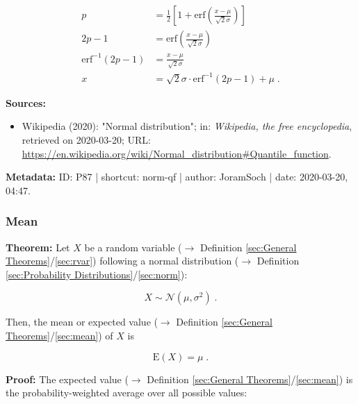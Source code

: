\documentclass[a4paper,12pt,twoside]{book}
\begin{document}
\begin{equation} \label{eq:norm-qf-norm-qf-s2}
\begin{split}
p &= \frac{1}{2} \left[ 1 + \mathrm{erf}\left( \frac{x-\mu}{\sqrt{2} \sigma} \right) \right] \\
2 p - 1 &= \mathrm{erf}\left( \frac{x-\mu}{\sqrt{2} \sigma} \right) \\
\mathrm{erf}^{-1}(2p-1) &= \frac{x-\mu}{\sqrt{2} \sigma} \\
x &= \sqrt{2}\sigma \cdot \mathrm{erf}^{-1}(2p-1) + \mu \; .
\end{split}
\end{equation}


\vspace{1em}
\textbf{Sources:}
\begin{itemize}
\item Wikipedia (2020): "Normal distribution"; in: \textit{Wikipedia, the free encyclopedia}, retrieved on 2020-03-20; URL: \url{https://en.wikipedia.org/wiki/Normal_distribution#Quantile_function}.
\end{itemize}


\vspace{1em}
\textbf{Metadata:} ID: P87 | shortcut: norm-qf | author: JoramSoch | date: 2020-03-20, 04:47.
\vspace{1em}



\subsubsection[\textbf{Mean}]{Mean} \label{sec:norm-mean}
\setcounter{equation}{0}

\textbf{Theorem:} Let $X$ be a random variable ($\rightarrow$ Definition \ref{sec:General Theorems}/\ref{sec:rvar}) following a normal distribution ($\rightarrow$ Definition \ref{sec:Probability Distributions}/\ref{sec:norm}):

\begin{equation} \label{eq:norm-mean-norm}
X \sim \mathcal{N}(\mu, \sigma^2) \; .
\end{equation}

Then, the mean or expected value ($\rightarrow$ Definition \ref{sec:General Theorems}/\ref{sec:mean}) of $X$ is

\begin{equation} \label{eq:norm-mean-norm-mean}
\mathrm{E}(X) = \mu \; .
\end{equation}


\vspace{1em}
\textbf{Proof:} The expected value ($\rightarrow$ Definition \ref{sec:General Theorems}/\ref{sec:mean}) is the probability-weighted average over all possible values:
\end{document}

